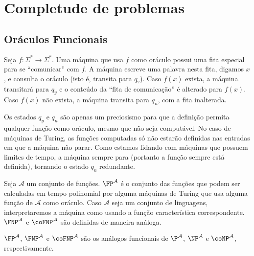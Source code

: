\section{Completude de problemas}

\subsection{Oráculos Funcionais}

\begin{definition}
    Seja $f : \Sigma^* \rightarrow \Sigma^*$.
    Uma máquina que usa $f$ como oráculo
    possui uma fita especial para se ``comunicar'' com $f$.
    A máquina escreve uma palavra nesta fita,
    digamos $x$,
    e consulta o oráculo
    (isto é, transita para $q_?$).
    Caso $f(x)$ exista,
    a máquina transitará para $q_y$
    e o conteúdo da ``fita de comunicação'' é alterado para $f(x)$.
    Caso $f(x)$ não exista,
    a máquina transita para $q_n$,
    com a fita inalterada.
\end{definition}

Os estados $q_y$ e $q_n$ são apenas um preciosismo
para que a definição permita qualquer função como oráculo,
mesmo que não seja computável.
No caso de máquinas de Turing,
as funções computadas só não estarão definidas
nas entradas em que a máquina não parar.
Como estamos lidando com máquinas que possuem limites de tempo,
a máquina sempre para
(portanto a função sempre está definida),
tornando o estado $q_n$ redundante.

\begin{definition}
    Seja $\mathcal A$ um conjunto de funções.
    $\FP^\mathcal A$ é o conjunto das funções
    que podem ser calculadas em tempo polinomial
    por alguma máquinas de Turing que usa alguma função de $\mathcal A$ como oráculo.
    Caso $\mathcal A$ seja um conjunto de linguagens,
    interpretaremos a máquina como usando a função característica correspondente.
    $\FNP^\mathcal A$ e $\coFNP^\mathcal A$
    são definidas de maneira análoga.
\end{definition}

$\FP^\mathcal A$, $\FNP^\mathcal A$ e $\coFNP^\mathcal A$
são os análogos funcionais de
$\P^\mathcal A$, $\NP^\mathcal A$ e $\coNP^\mathcal A$,
respectivamente.
